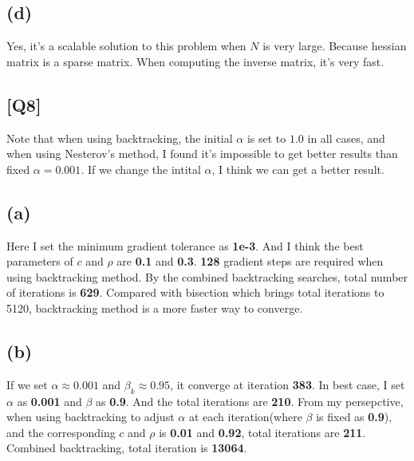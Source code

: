 \documentclass[12pt, a4 paper]{article}
\begin{document}
\begin{framed}
        \subsection{(d)}
        Yes, it's a scalable solution to this problem when $N$ is very large. Because hessian matrix is a sparse matrix. When computing the inverse matrix, it's very fast.
    \end{framed}

    \begin{framed}
        \section{[Q8]}
        Note that when using backtracking, the initial $\alpha$ is 
        set to $1.0$ in all cases, and when using Nesterov's method,
        I found it's impossible to get better results than fixed $\alpha=
        0.001$. If we change the intital $\alpha$, I think we can get a
        better result.

        \subsection{(a)}
        Here I set the minimum gradient tolerance as \textbf{1e-3}. And I think the best parameters
         of $c$ and $\rho$ are \textbf{0.1} and \textbf{0.3}. \textbf{128} 
         gradient steps are required when using backtracking method. By the combined
          backtracking searches, total number of iterations is \textbf{629}. Compared 
          with bisection which brings total iterations to 5120, backtracking 
          method is a more faster way to converge.

        \subsection{(b)}
        If we set $\alpha \approx 0.001$ and $\beta_{k} \approx 0.95$, it converge at iteration
        \textbf{383}. In best case, I set $\alpha$ as \textbf{0.001} and $\beta$ as \textbf{0.9}. 
        And the total iterations are \textbf{210}. From my persepctive, when using backtracking 
        to adjust $\alpha$ at each iteration(where $\beta$ is fixed as \textbf{0.9}),  and the 
        corresponding $c$ and $\rho$ is \textbf{0.01} and \textbf{0.92}, total 
        iterations are \textbf{211}. Combined backtracking, total iteration is \textbf{13064}.


\end{framed}
\end{document}
